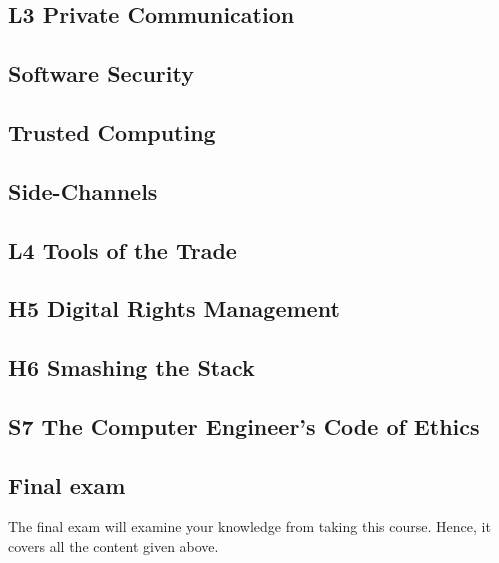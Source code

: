 \subsection{L3 Private Communication}


\subsection{Software Security}


\subsection{Trusted Computing}


\subsection{Side-Channels}


\subsection{L4 Tools of the Trade}


%

\subsection{H5 Digital Rights Management}


\subsection{H6 Smashing the Stack}


\subsection{S7 The Computer Engineer's Code of Ethics}


\subsection{Final exam}

The final exam will examine your knowledge from taking this course.
Hence, it covers all the content given above.


